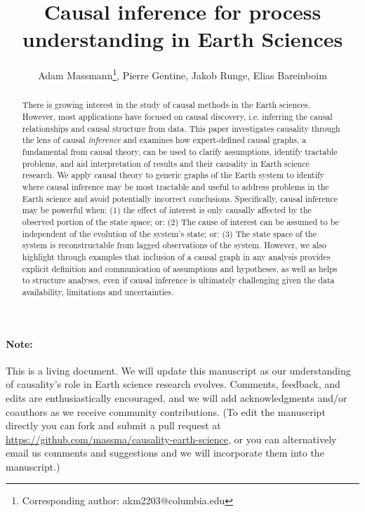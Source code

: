 \documentclass[12pt]{article}
\begin{document}
\title{Causal inference for process understanding in Earth Sciences}

\author{Adam Massmann\thanks{Corresponding author:
    akm2203@columbia.edu}, Pierre Gentine, Jakob Runge, Elias Bareinboim}

\maketitle
\begin{abstract}
  There is growing interest in the study of causal methods in the
  Earth sciences. However, most applications have focused on causal
  discovery, i.e. inferring the causal relationships and causal structure
  from data. This paper investigates causality through the lens of causal
  {\it inference} and examines how expert-defined causal graphs, a
  fundamental from causal theory, can be used to clarify assumptions,
  identify tractable problems, and aid interpretation of results and
  their causality in Earth science research. We apply causal theory to
  generic graphs of the Earth system to identify where causal
  inference may be most tractable and useful to address problems in
  the Earth science and avoid potentially incorrect
  conclusions. Specifically, causal inference may be
  powerful when: (1) the effect of interest is only causally affected
  by the observed portion of the state space; or: (2) The cause of
  interest can be assumed to be independent of the evolution of the
  system’s state; or: (3) The state space of the system is
  reconstructable from lagged observations of the system. However, we
  also highlight through examples that inclusion of a causal graph in
  any analysis provides explicit definition and communication of
  assumptions and hypotheses, as well as helps to structure analyses, even if
  causal inference is ultimately challenging given the data
  availability, limitations and uncertainties.
\end{abstract}

\paragraph{Note:} This is a living document. We will update this
manuscript as our understanding of causality's role in Earth science
research evolves. Comments, feedback, and edits are enthusiastically
encouraged, and we will add acknowledgments and/or coauthors as we
receive community contributions. (To edit the manuscript directly you
can fork and submit a pull request at
\url{https://github.com/massma/causality-earth-science}, or you can
alternatively email us comments and suggestions and we will
incorporate them into the manuscript.)
\end{document}
